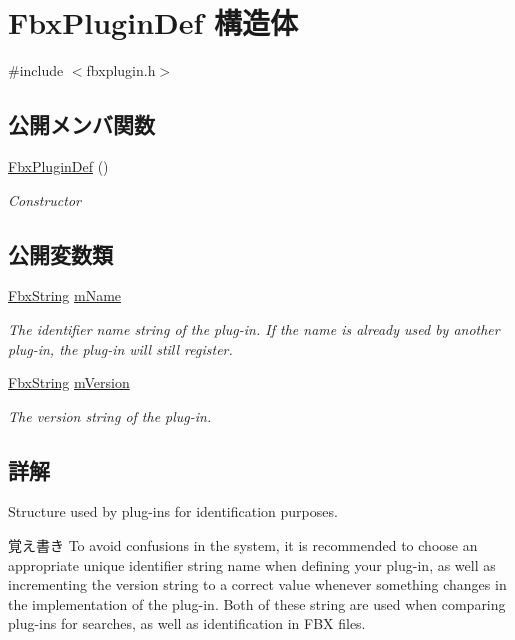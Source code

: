 \hypertarget{struct_fbx_plugin_def}{}\section{Fbx\+Plugin\+Def 構造体}
\label{struct_fbx_plugin_def}


{\ttfamily \#include $<$fbxplugin.\+h$>$}

\subsection*{公開メンバ関数}
\begin{DoxyCompactItemize}
\item 
\hyperlink{struct_fbx_plugin_def_af1895c60f86c6d173758a6c3f6979d32}{Fbx\+Plugin\+Def} ()
\begin{DoxyCompactList}\small\item\em Constructor \end{DoxyCompactList}\end{DoxyCompactItemize}
\subsection*{公開変数類}
\begin{DoxyCompactItemize}
\item 
\hyperlink{class_fbx_string}{Fbx\+String} \hyperlink{struct_fbx_plugin_def_ac98378284bf666cbba614e9121ba7189}{m\+Name}
\begin{DoxyCompactList}\small\item\em The identifier name string of the plug-\/in. If the name is already used by another plug-\/in, the plug-\/in will still register. \end{DoxyCompactList}\item 
\hyperlink{class_fbx_string}{Fbx\+String} \hyperlink{struct_fbx_plugin_def_aeea048adb24ec74cb906df076bedf21d}{m\+Version}
\begin{DoxyCompactList}\small\item\em The version string of the plug-\/in. \end{DoxyCompactList}\end{DoxyCompactItemize}


\subsection{詳解}
Structure used by plug-\/ins for identification purposes. \begin{DoxyNote}{覚え書き}
To avoid confusions in the system, it is recommended to choose an appropriate unique identifier string name when defining your plug-\/in, as well as incrementing the version string to a correct value whenever something changes in the implementation of the plug-\/in. Both of these string are used when comparing plug-\/ins for searches, as well as identification in F\+BX files. 
\end{DoxyNote}


